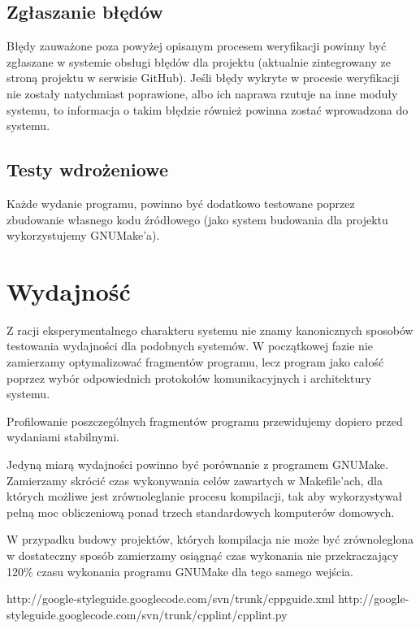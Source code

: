 \documentclass[a4paper]{article}
\begin{document}
\subsection{Zgłaszanie błędów}

Błędy zauważone poza powyżej opisanym procesem weryfikacji powinny być zgłaszane w systemie obsługi błędów dla projektu (aktualnie zintegrowany ze stroną projektu w serwisie GitHub). Jeśli błędy wykryte w procesie weryfikacji nie zostały natychmiast poprawione, albo ich naprawa rzutuje na inne moduły systemu, to informacja o takim błędzie również powinna zostać wprowadzona do systemu.

\subsection{Testy wdrożeniowe}

Każde wydanie programu, powinno być dodatkowo testowane poprzez zbudowanie własnego kodu źródłowego (jako system budowania dla projektu wykorzystujemy GNUMake’a).

\section{Wydajność}

Z racji eksperymentalnego charakteru systemu nie znamy kanonicznych sposobów testowania wydajności dla podobnych systemów. W początkowej fazie nie zamierzamy optymalizować fragmentów programu, lecz program jako całość poprzez wybór odpowiednich protokołów komunikacyjnych i architektury systemu.

Profilowanie poszczególnych fragmentów programu przewidujemy dopiero przed wydaniami stabilnymi.

Jedyną miarą wydajności powinno być porównanie z programem GNUMake. Zamierzamy skrócić czas wykonywania celów zawartych w Makefile’ach, dla których możliwe jest zrównoleglanie procesu kompilacji, tak aby wykorzystywał pełną moc obliczeniową ponad trzech standardowych komputerów domowych.

W przypadku budowy projektów, których kompilacja nie może być zrównoleglona w dostateczny sposób zamierzamy osiągnąć czas wykonania nie przekraczający 120\% czasu wykonania programu GNUMake dla tego samego wejścia.

\begin{thebibliography}{9}
 http://google-styleguide.googlecode.com/svn/trunk/cppguide.xml
 http://google-styleguide.googlecode.com/svn/trunk/cpplint/cpplint.py
\end{thebibliography}
\end{document}
